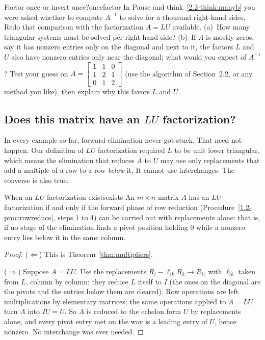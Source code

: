 \documentclass[11pt]{article}
\begin{document}
\begin{think}{Factor once or invert once?}{oncefactor}
In Pause and think~\ref{2.2-think:manyb} you were asked whether to compute $A^{-1}$ to solve for a thousand right-hand sides. Redo that comparison with the factorization $A=LU$ available. (a)~How many triangular systems must be solved per right-hand side? (b)~If $A$ is mostly zeros, say it has nonzero entries only on the diagonal and next to it, the factors $L$ and $U$ also have nonzero entries only near the diagonal; what would you expect of $A^{-1}$? Test your guess on $A=\begin{bmatrix}1&1&0\\1&2&1\\0&1&2\end{bmatrix}$ (use the algorithm of Section~2.2, or any method you like), then explain why this favors $L$ and $U$.
\end{think}

\subsection*{Does this matrix have an $LU$ factorization?}

In every example so far, forward elimination never got stuck. That need not happen. Our definition of $LU$ factorization required $L$ to be unit lower triangular, which means the elimination that reduces $A$ to $U$ may use only replacements that add a multiple of a row to a row \emph{below} it. It cannot use interchanges. The converse is also true.

\begin{thm}{When an $LU$ factorization exists}{exists}
An $m\times n$ matrix $A$ has an $LU$ factorization if and only if the forward phase of row reduction (Procedure~\ref{1.2-proc:rowreduce}, steps 1 to 4) can be carried out with replacements alone: that is, if no stage of the elimination finds a pivot position holding $0$ while a nonzero entry lies below it in the same column.
\end{thm}

\begin{proof}
($\Leftarrow$) This is Theorem~\ref{thm:multipliers}.

($\Rightarrow$) Suppose $A=LU$. Use the replacements $R_i-\ell_{ik}R_k\to R_i$, with $\ell_{ik}$ taken from $L$, column by column: they reduce $L$ itself to $I$ (the ones on the diagonal are the pivots and the entries below them are cleared). Row operations are left multiplications by elementary matrices; the same operations applied to $A=LU$ turn $A$ into $IU=U$. So $A$ is reduced to the echelon form $U$ by replacements alone, and every pivot entry met on the way is a leading entry of $U$, hence nonzero. No interchange was ever needed.
\end{proof}
\end{document}
